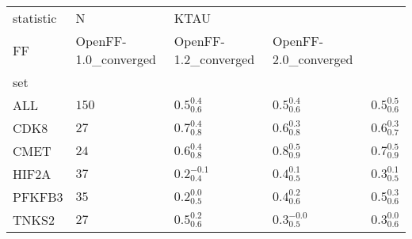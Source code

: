 \begin{tabular}{lllll}
\toprule
statistic &      N & \multicolumn{3}{l}{KTAU} \\
FF & OpenFF-1.0_converged & OpenFF-1.2_converged & OpenFF-2.0_converged \\
set    &        &                      &                      &                      \\
\midrule
ALL    &  $150$ &    $0.5^{0.4}_{0.6}$ &    $0.5^{0.4}_{0.6}$ &    $0.5^{0.5}_{0.6}$ \\
CDK8   &   $27$ &    $0.7^{0.4}_{0.8}$ &    $0.6^{0.3}_{0.8}$ &    $0.6^{0.3}_{0.7}$ \\
CMET   &   $24$ &    $0.6^{0.4}_{0.8}$ &    $0.8^{0.5}_{0.9}$ &    $0.7^{0.5}_{0.9}$ \\
HIF2A  &   $37$ &   $0.2^{-0.1}_{0.4}$ &    $0.4^{0.1}_{0.5}$ &    $0.3^{0.1}_{0.5}$ \\
PFKFB3 &   $35$ &    $0.2^{0.0}_{0.5}$ &    $0.4^{0.2}_{0.6}$ &    $0.5^{0.3}_{0.6}$ \\
TNKS2  &   $27$ &    $0.5^{0.2}_{0.6}$ &   $0.3^{-0.0}_{0.5}$ &    $0.3^{0.0}_{0.6}$ \\
\bottomrule
\end{tabular}
